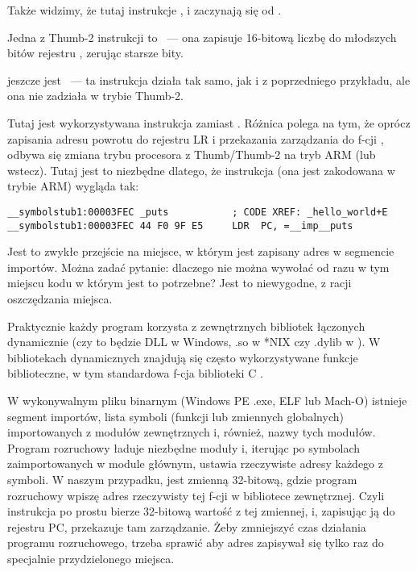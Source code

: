 Także widzimy, że tutaj instrukcje ,  i  zaczynają się od .

Jedna z Thumb-2 instrukcji to
~--- ona zapisuje 16-bitową liczbę do młodszych bitów rejestru , zerując starsze bity.

jeszcze jest ~--- ta instrukcja działa tak samo, jak i  z poprzedniego przykładu, ale ona nie zadziała w trybie Thumb-2.

Tutaj jest wykorzystywana instrukcja  zamiast .
Różnica polega na tym, że oprócz zapisania adresu powrotu do rejestru \ac{LR} i przekazania zarządzania 
do f-cji \puts, odbywa się zmiana trybu procesora z Thumb/Thumb-2 na tryb ARM (lub wstecz).
Tutaj jest to niezbędne dlatego, że instrukcja (ona jest zakodowana w trybie ARM) wygląda tak:

\begin{lstlisting}[style=customasmARM]
__symbolstub1:00003FEC _puts           ; CODE XREF: _hello_world+E
__symbolstub1:00003FEC 44 F0 9F E5     LDR  PC, =__imp__puts
\end{lstlisting}

Jest to zwykłe przejście na miejsce, w którym jest zapisany adres \puts w segmencie importów.
Można zadać pytanie: dlaczego nie można wywołać \puts od razu w tym miejscu kodu w którym jest to potrzebne?
Jest to niewygodne, z racji oszczędzania miejsca.

Praktycznie każdy program korzysta z zewnętrznych bibliotek łączonych dynamicznie (czy to będzie DLL w Windows, .so w *NIX 
czy .dylib w \MacOSX).
W bibliotekach dynamicznych znajdują się często wykorzystywane funkcje biblioteczne, w tym standardowa f-cja biblioteki C \puts.

W wykonywalnym pliku binarnym 
(Windows PE .exe, ELF lub Mach-O) istnieje segment importów, lista symboli (funkcji lub zmiennych globalnych) importowanych z modułów zewnętrznych i, również, nazwy tych modułów.
Program rozruchowy ładuje niezbędne moduły i, iterując po symbolach zaimportowanych w module głównym, ustawia rzeczywiste adresy każdego z symboli.
W naszym przypadku,  
jest zmienną 32-bitową, gdzie program rozruchowy wpiszę adres rzeczywisty tej f-cji w bibliotece zewnętrznej. 
Czyli instrukcja  po prostu bierze 32-bitową wartość z tej zmiennej, i, zapisując ją do rejestru \ac{PC}, przekazuje tam zarządzanie.
Żeby zmniejszyć czas działania programu rozruchowego, trzeba sprawić aby adres zapisywał się tylko raz do specjalnie przydzielonego miejsca.


